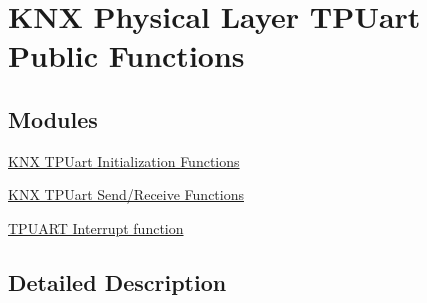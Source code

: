 \hypertarget{group___k_n_x___p_h___t_p_u_a_r_t___public___functions}{}\section{K\+NX Physical Layer T\+P\+Uart Public Functions}
\label{group___k_n_x___p_h___t_p_u_a_r_t___public___functions}
\subsection*{Modules}
\begin{DoxyCompactItemize}
\item 
\hyperlink{group___k_n_x___p_h___t_p_uart___exported___functions___group1}{K\+N\+X T\+P\+Uart Initialization Functions}
\item 
\hyperlink{group___k_n_x___p_h___t_p_uart___exported___functions___group2}{K\+N\+X T\+P\+Uart Send/\+Receive Functions}
\item 
\hyperlink{group___k_n_x___p_h___t_p_uart___exported___functions___group3}{T\+P\+U\+A\+R\+T Interrupt function}
\end{DoxyCompactItemize}


\subsection{Detailed Description}
